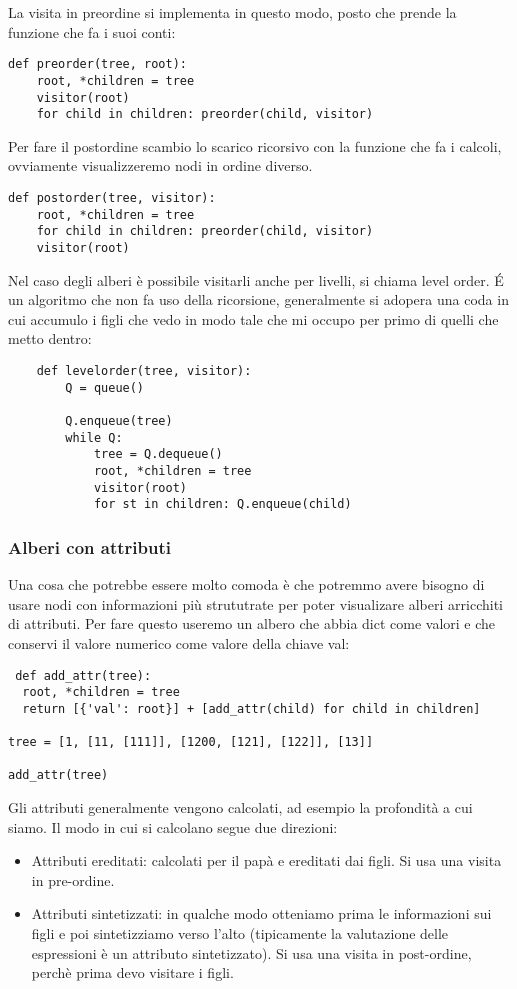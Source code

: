 La visita in preordine si implementa in questo modo, posto che prende la funzione che fa i suoi conti:
\begin{lstlisting} 
def preorder(tree, root):
    root, *children = tree
    visitor(root)
    for child in children: preorder(child, visitor)
\end{lstlisting}

Per fare il postordine scambio lo scarico ricorsivo con la funzione che fa i calcoli, ovviamente visualizzeremo nodi in ordine diverso.
\begin{lstlisting} 
def postorder(tree, visitor):
    root, *children = tree
    for child in children: preorder(child, visitor)
    visitor(root)
\end{lstlisting}

Nel caso degli alberi è possibile visitarli anche per livelli, si chiama level order. \'E un algoritmo che non fa uso della ricorsione, generalmente si adopera una coda in cui accumulo i figli che vedo in modo tale che mi occupo per primo di quelli che metto dentro:

\begin{lstlisting}
    def levelorder(tree, visitor):
        Q = queue()

        Q.enqueue(tree)
        while Q:
            tree = Q.dequeue()
            root, *children = tree
            visitor(root)
            for st in children: Q.enqueue(child)
\end{lstlisting}

\subsubsection{Alberi con attributi}

Una cosa che potrebbe essere molto comoda è che potremmo avere bisogno di usare nodi con informazioni più strututrate per poter visualizare alberi arricchiti di attributi. Per fare questo useremo un albero che abbia dict come valori e che conservi il valore numerico come valore della chiave val:
\begin{lstlisting} 
 def add_attr(tree):
  root, *children = tree
  return [{'val': root}] + [add_attr(child) for child in children]

tree = [1, [11, [111]], [1200, [121], [122]], [13]]

add_attr(tree)
\end{lstlisting} 

Gli attributi generalmente vengono calcolati, ad esempio la profondità a cui siamo. Il modo in cui si calcolano segue due direzioni:
\begin{itemize}
    \item Attributi ereditati: calcolati per il papà e ereditati dai figli. Si usa una visita in pre-ordine.
    \item Attributi sintetizzati: in qualche modo otteniamo prima le informazioni sui figli e poi sintetizziamo verso l'alto (tipicamente la valutazione delle espressioni è un attributo sintetizzato). Si usa una visita in post-ordine, perchè prima devo visitare i figli.
\end{itemize}

